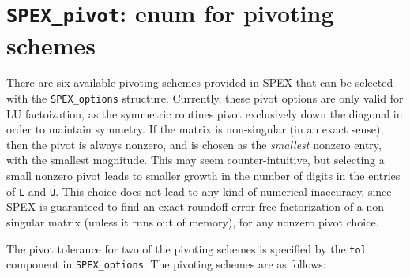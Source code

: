 \documentclass[12pt,oneside]{book}
\theoremstyle{definition}
\begin{document}
\section{\texttt{SPEX\_pivot}: enum for pivoting schemes}\label{ss:SPEX_pivot}
There are six available pivoting schemes provided in SPEX that can be
selected with the \verb|SPEX_options| structure. Currently, these pivot options
are only valid for LU factoization, as the symmetric routines pivot exclusively
down the diagonal in order to maintain symmetry. If the matrix is non-singular
(in an exact sense), then the pivot is always nonzero, and is chosen as the
{\em smallest} nonzero entry, with the smallest magnitude.  This may seem
counter-intuitive, but selecting a small nonzero pivot leads to smaller growth
in the number of digits in the entries of \verb|L| and \verb|U|.  This choice
does not lead to any kind of numerical inaccuracy, since SPEX is guaranteed
to find an exact roundoff-error free factorization of a non-singular matrix
(unless it runs out of memory), for any nonzero pivot choice.

The pivot tolerance for two of the pivoting schemes is specified by the
\verb|tol| component in \verb|SPEX_options|.  The pivoting schemes are as
follows:
\end{document}
